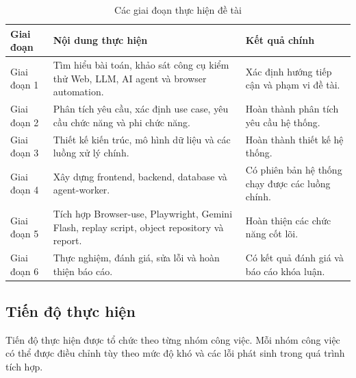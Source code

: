 \begin{table}[H]
\centering
\caption{Các giai đoạn thực hiện đề tài}
\label{tab:chapter7_project_phases}
\renewcommand{\arraystretch}{1.2}
\begin{tabular}{|p{3.2cm}|p{7.0cm}|p{4.0cm}|}
\hline
\textbf{Giai đoạn} & \textbf{Nội dung thực hiện} & \textbf{Kết quả chính} \\
\hline
Giai đoạn 1 & Tìm hiểu bài toán, khảo sát công cụ kiểm thử Web, LLM, AI agent và browser automation. & Xác định hướng tiếp cận và phạm vi đề tài. \\
\hline
Giai đoạn 2 & Phân tích yêu cầu, xác định use case, yêu cầu chức năng và phi chức năng. & Hoàn thành phân tích yêu cầu hệ thống. \\
\hline
Giai đoạn 3 & Thiết kế kiến trúc, mô hình dữ liệu và các luồng xử lý chính. & Hoàn thành thiết kế hệ thống. \\
\hline
Giai đoạn 4 & Xây dựng frontend, backend, database và agent-worker. & Có phiên bản hệ thống chạy được các luồng chính. \\
\hline
Giai đoạn 5 & Tích hợp Browser-use, Playwright, Gemini Flash, replay script, object repository và report. & Hoàn thiện các chức năng cốt lõi. \\
\hline
Giai đoạn 6 & Thực nghiệm, đánh giá, sửa lỗi và hoàn thiện báo cáo. & Có kết quả đánh giá và báo cáo khóa luận. \\
\hline
\end{tabular}
\end{table}

\subsection{Tiến độ thực hiện}

Tiến độ thực hiện được tổ chức theo từng nhóm công việc. Mỗi nhóm công việc có thể được điều chỉnh tùy theo mức độ khó và các lỗi phát sinh trong quá trình tích hợp.

